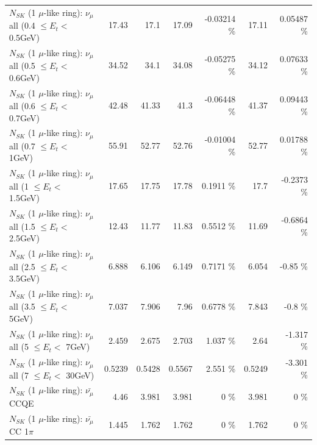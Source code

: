 \begin{table}
\begin{tabular}{| l | r | r | r  r | r  r |}
       $N_{SK}$ (1 $\mu$-like ring): $\nu_{\mu}$ all (0.4 $\leq E_{t} <$ 0.5GeV) &           17.43 &            17.1 &           17.09 & -0.03214 \%  &           17.11 &  0.05487 \%  \\ 
       $N_{SK}$ (1 $\mu$-like ring): $\nu_{\mu}$ all (0.5 $\leq E_{t} <$ 0.6GeV) &           34.52 &            34.1 &           34.08 & -0.05275 \%  &           34.12 &  0.07633 \%  \\ 
       $N_{SK}$ (1 $\mu$-like ring): $\nu_{\mu}$ all (0.6 $\leq E_{t} <$ 0.7GeV) &           42.48 &           41.33 &            41.3 & -0.06448 \%  &           41.37 &  0.09443 \%  \\ 
         $N_{SK}$ (1 $\mu$-like ring): $\nu_{\mu}$ all (0.7 $\leq E_{t} <$ 1GeV) &           55.91 &           52.77 &           52.76 & -0.01004 \%  &           52.77 &  0.01788 \%  \\ 
         $N_{SK}$ (1 $\mu$-like ring): $\nu_{\mu}$ all (1 $\leq E_{t} <$ 1.5GeV) &           17.65 &           17.75 &           17.78 &   0.1911 \%  &            17.7 &  -0.2373 \%  \\ 
       $N_{SK}$ (1 $\mu$-like ring): $\nu_{\mu}$ all (1.5 $\leq E_{t} <$ 2.5GeV) &           12.43 &           11.77 &           11.83 &   0.5512 \%  &           11.69 &  -0.6864 \%  \\ 
       $N_{SK}$ (1 $\mu$-like ring): $\nu_{\mu}$ all (2.5 $\leq E_{t} <$ 3.5GeV) &           6.888 &           6.106 &           6.149 &   0.7171 \%  &           6.054 &    -0.85 \%  \\ 
         $N_{SK}$ (1 $\mu$-like ring): $\nu_{\mu}$ all (3.5 $\leq E_{t} <$ 5GeV) &           7.037 &           7.906 &            7.96 &   0.6778 \%  &           7.843 &     -0.8 \%  \\ 
           $N_{SK}$ (1 $\mu$-like ring): $\nu_{\mu}$ all (5 $\leq E_{t} <$ 7GeV) &           2.459 &           2.675 &           2.703 &    1.037 \%  &            2.64 &   -1.317 \%  \\ 
          $N_{SK}$ (1 $\mu$-like ring): $\nu_{\mu}$ all (7 $\leq E_{t} <$ 30GeV) &          0.5239 &          0.5428 &          0.5567 &    2.551 \%  &          0.5249 &   -3.301 \%  \\ 
\hline
\hline
\hline
                              $N_{SK}$ (1 $\mu$-like ring): $\bar{\nu_\mu}$ CCQE &            4.46 &           3.981 &           3.981 &        0 \%  &           3.981 &        0 \%  \\ 
                         $N_{SK}$ (1 $\mu$-like ring): $\bar{\nu_\mu}$ CC 1$\pi$ &           1.445 &           1.762 &           1.762 &        0 \%  &           1.762 &        0 \%  \\ 

\end{tabular}
\end{table}
